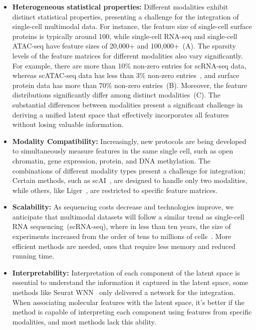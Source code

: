 \begin{itemize}
	\item \textbf{Heterogeneous statistical properties:}
	Different modalities exhibit distinct statistical properties, presenting a challenge for the integration of single-cell multimodal data. For instance, the feature size of single-cell surface proteins is typically around 100, while single-cell RNA-seq and single-cell ATAC-seq have feature sizes of 20,000+ and 100,000+~(A). The sparsity levels of the feature matrices for different modalities also vary significantly. For example, there are more than 10\% non-zero entries for scRNA-seq data, whereas scATAC-seq data has less than 3\% non-zero entries~\citep{li2021chromatin}, and surface protein data has more than 70\% non-zero entries~(B). Moreover, the feature distributions significantly differ among distinct modalities~(C). The substantial differences between modalities present a significant challenge in deriving a unified latent space that effectively incorporates all features without losing valuable information.


	\item \textbf{Modality Compatibility:}
	Increasingly, new protocols are being developed to simultaneously measure features in the same single cell, such as open chromatin, gene expression, protein, and DNA methylation. The combinations of different modality types present a challenge for integration; Certain methods, such as scAI~\citep{jin2020scai}, are designed to handle only two modalities, while others, like Liger~\citep{kriebel2022uinmf}, are restricted to specific feature matrices.

	\item \textbf{Scalability:}
	As sequencing costs decrease and technologies improve, we anticipate that multimodal datasets will follow a similar trend as single-cell RNA sequencing~(scRNA-seq), where in less than ten years, the size of experiments increased from the order of tens to millions of cells~\citep{svensson2018exponential}. More efficient methods are needed, ones that require less memory and reduced running time.

	\item \textbf{Interpretability:}
	Interpretation of each component of the latent space is essential to understand the information it captured in the latent space, some methods like Seurat WNN~\citep{hao2021seurat4} only delivered a network for the integration. When associating molecular features with the latent space, it's better if the method is capable of interpreting each component using features from specific modalities, and most methods lack this ability.



\end{itemize}
